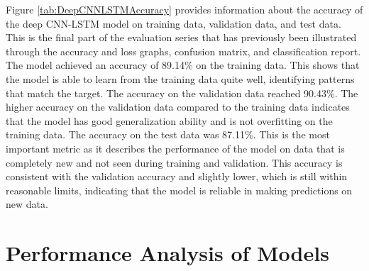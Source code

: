 Figure \ref{tab:DeepCNNLSTMAccuracy} provides information about the accuracy of the deep CNN-LSTM model on training data, validation data, and test data. This is the final part of the evaluation series that has previously been illustrated through the accuracy and loss graphs, confusion matrix, and classification report. The model achieved an accuracy of 89.14\% on the training data. This shows that the model is able to learn from the training data quite well, identifying patterns that match the target. The accuracy on the validation data reached 90.43\%. The higher accuracy on the validation data compared to the training data indicates that the model has good generalization ability and is not overfitting on the training data. The accuracy on the test data was 87.11\%. This is the most important metric as it describes the performance of the model on data that is completely new and not seen during training and validation. This accuracy is consistent with the validation accuracy and slightly lower, which is still within reasonable limits, indicating that the model is reliable in making predictions on new data.


\section{Performance Analysis of Models}
\label{sec:ModelAnalysis}

